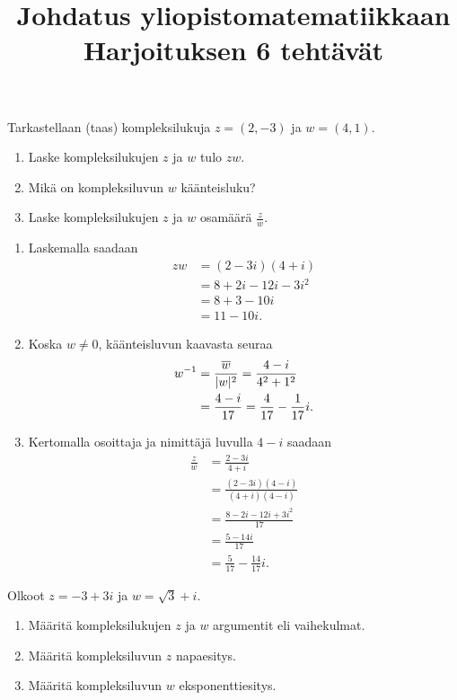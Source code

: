 \documentclass[11pt,a4paper]{amsart}
\title{Johdatus yliopistomatematiikkaan\\Harjoituksen 6 tehtävät}
\date{}
\author{}
\begin{document}

\begin{exercise}
  Tarkastellaan (taas) kompleksilukuja \(z = (2, -3)\) ja \(w = (4, 1)\).
\begin{enumerate}[label=\alph*), nosep]
  \item Laske kompleksilukujen \(z\) ja \(w\) tulo \(zw\).
  \item Mikä on kompleksiluvun \(w\) käänteisluku?
  \item Laske kompleksilukujen \(z\) ja \(w\) osamäärä \(\frac{z}{w}\).
\end{enumerate}
\end{exercise}

\begin{solution}
\leavevmode\par
\begin{enumerate}[label=\alph*), nosep]
\item Laskemalla saadaan
  \[
    \begin{aligned}
      zw &= (2 - 3i)(4 + i) \\
      &= 8 + 2i - 12i - 3i^2 \\
      &= 8 + 3 - 10i \\
      &= 11 - 10i.
    \end{aligned}
  \]
\item Koska \(w \neq 0\), käänteisluvun kaavasta seuraa
  \[
    \begin{aligned}
      w^{-1} &= \frac{\overline{w}}{\lvert w\rvert^2}
      = \frac{4 - i}{4^2 + 1^2} \\
      &= \frac{4 - i}{17}
      = \frac{4}{17} - \frac{1}{17}i.
    \end{aligned}
  \]
\item Kertomalla osoittaja ja nimittäjä luvulla \(4 - i\) saadaan
  \[
    \begin{aligned}
      \frac{z}{w} &= \frac{2 - 3i}{4 + i} \\
      &= \frac{(2 - 3i)(4 - i)}{(4 + i)(4 - i)} \\
      &= \frac{8 - 2i - 12i + 3i^2}{17} \\
      &= \frac{5 - 14i}{17} \\
      &= \frac{5}{17} - \frac{14}{17}i.
    \end{aligned}
  \]
\end{enumerate}
\end{solution}

\begin{exercise}
Olkoot \(z = -3 + 3i\) ja \(w = \sqrt{3} + i\).
\begin{enumerate}[label=\alph*), nosep]
\item Määritä kompleksilukujen \(z\) ja \(w\) argumentit eli vaihekulmat.
\item Määritä kompleksiluvun \(z\) napaesitys.
\item Määritä kompleksiluvun \(w\) eksponenttiesitys.
\end{enumerate}
\end{exercise}
\end{document}
